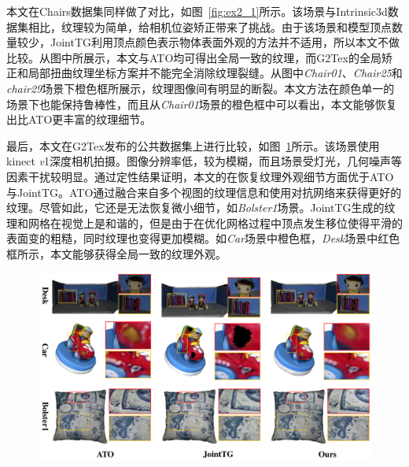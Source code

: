 本文在Chairs数据集同样做了对比，如图~\ref{fig:ex2_1}所示。该场景与Intrinsic3d数据集相比，纹理较为简单，给相机位姿矫正带来了挑战。由于该场景和模型顶点数量较少，JointTG利用顶点颜色表示物体表面外观的方法并不适用，所以本文不做比较。从图中所展示，本文与ATO均可得出全局一致的纹理，而G2Tex的全局矫正和局部扭曲纹理坐标方案并不能完全消除纹理裂缝。从图中\emph{Chair01}、\emph{Chair25}和\emph{chair29}场景下橙色框所展示，纹理图像间有明显的断裂。本文方法在颜色单一的场景下也能保持鲁棒性，而且从\emph{Chair01}场景的橙色框中可以看出，本文能够恢复出比ATO更丰富的纹理细节。\par

最后，本文在G2Tex发布的公共数据集上进行比较，如图~\ref{fig:ex2_2}所示。该场景使用kinect \emph{v}1深度相机拍摄。图像分辨率低，较为模糊，而且场景受灯光，几何噪声等因素干扰较明显。通过定性结果证明，本文的在恢复纹理外观细节方面优于ATO与JointTG。ATO通过融合来自多个视图的纹理信息和使用对抗网络来获得更好的纹理。尽管如此，它还是无法恢复微小细节，如\emph{Bolster1}场景。JointTG生成的纹理和网格在视觉上是和谐的，但是由于在优化网格过程中顶点发生移位使得平滑的表面变的粗糙，同时纹理也变得更加模糊。如\emph{Car}场景中橙色框，\emph{Desk}场景中红色框所示，本文能够获得全局一致的纹理外观。\par

\begin{figure}[!t]
\centering
\includegraphics[width=1\linewidth]{pic/work2/compare2.pdf}
\label{fig:ex2_2}
\end{figure}



